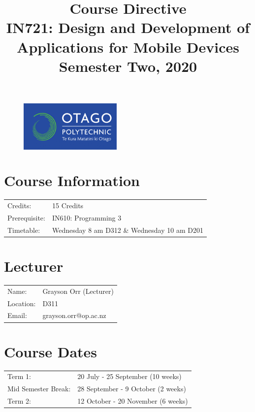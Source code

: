 \documentclass{article}
\author{}
\begin{document}
\begin{figure}
	\includegraphics[width=50mm]{../resources/img/logo.png}
\end{figure}

\title{Course Directive\\IN721: Design and Development of Applications for Mobile Devices\\Semester Two, 2020}
\date{}
\maketitle

\section*{Course Information}
\begin{tabular}{ll}
	Credits:      & 15 Credits                                  \\
	Prerequisite: & IN610: Programming 3                        \\
	Timetable:    & Wednesday 8 am D312 \& Wednesday 10 am D201 \\
\end{tabular}

\section*{Lecturer}
\begin{tabular}{ll}
	Name:     & Grayson Orr (Lecturer) \\
	Location: & D311                   \\
	Email:    & grayson.orr@op.ac.nz   \\
\end{tabular}

\section*{Course Dates}
\begin{tabular}{ll}
	Term 1:             & 20 July - 25 September (10 weeks)  \\
	Mid Semester Break: & 28 September - 9 October (2 weeks) \\
	Term 2:             & 12 October - 20 November (6 weeks) \\
\end{tabular}
\end{document}
